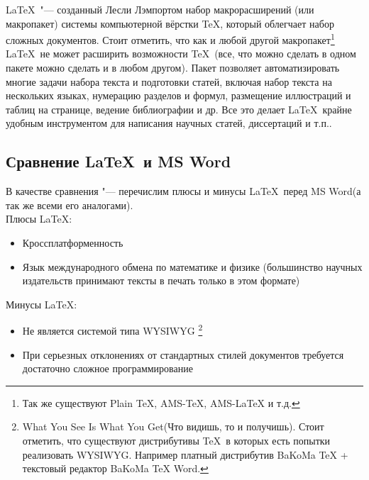 \documentclass{article}
\begin{document}
			\LaTeX ~"--- созданный Лесли Лэмпортом набор макрорасширений (или макропакет) системы компьютерной вёрстки \TeX, 				который облегчает набор сложных документов. Стоит отметить, что как и любой другой макропакет\footnote{ Так же существуют 		Plain TeX, AMS-TeX, AMS-LaTeX и т.д.} \LaTeX ~не может расширить возможности \TeX ~(все, что можно сделать в одном пакете 		можно сделать и в любом другом). Пакет позволяет автоматизировать многие задачи набора текста и подготовки статей, 					включая набор текста на нескольких языках, нумерацию разделов и формул, размещение иллюстраций и таблиц на странице, 				ведение библиографии и др. Все это делает \LaTeX ~крайне удобным инструментом для написания научных статей, диссертаций и 		т.п..
					
		\subsection{Сравнение \LaTeX ~и MS Word}
			В качестве сравнения "--- перечислим плюсы и минусы \LaTeX ~перед MS Word(а так же всеми его аналогами). \\	
	    Плюсы \LaTeX: 
	    \begin{itemize} 
	    	\item	Кроссплатформенность 
	    	\item	Язык международного обмена по математике и физике (большинство     
   					научных издательств принимают тексты в печать  только в этом формате)
    	\end{itemize}
    Минусы \LaTeX:
		\begin{itemize} 
	    	\item	Не является системой типа WYSIWYG
	    				\footnote{What You See Is What You Get(Что видишь, то и получишь). Стоит отметить, что существуют 									дистрибутивы \TeX ~в которых есть попытки реализовать WYSIWYG. Например платный дистрибутив  BaKoMa TeX + 						текстовый редактор  BaKoMa TeX Word.}   
	    	\item	При серьезных отклонениях от стандартных стилей документов требуется
					достаточно сложное программирование	
    	\end{itemize}
    	
\end{document}
